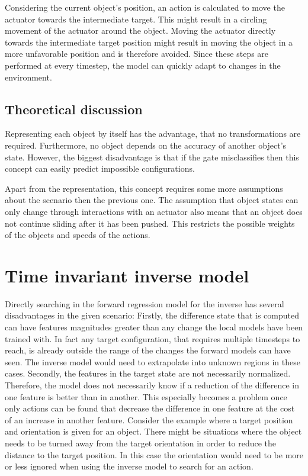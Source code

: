 Considering the current object's position, an action is calculated to move the actuator towards the intermediate target. This might result in a circling movement of the actuator around the object. Moving the actuator directly towards the intermediate target position might result in moving the object in a more unfavorable position and is therefore avoided. Since these steps are performed at every timestep, the model can quickly adapt to changes in the environment.
	
\subsection{Theoretical discussion}

Representing each object by itself has the advantage, that no transformations are required. Furthermore, no object depends on the accuracy of another object's state. However, the biggest disadvantage is that if the gate misclassifies then this concept can easily predict impossible configurations. 

Apart from the representation, this concept requires some more assumptions about the scenario then the previous one. The assumption that object states can only change through interactions with an actuator also means that an object does not continue sliding after it has been pushed. This restricts the possible weights of the objects and speeds of the actions.

\section{Time invariant inverse model \label{sec:invModel}}
	
Directly searching in the forward regression model for the inverse has several disadvantages in the given scenario: Firstly, the difference state that is computed can have features magnitudes greater than any change the local models have been trained with. In fact any target configuration, that requires multiple timesteps to reach, is already outside the range of the changes the forward models can have seen. %
The inverse model would need to extrapolate into unknown regions in these cases. Secondly, the features in the target state are not necessarily normalized. Therefore, the model does not necessarily know if a reduction of the difference in one feature is better than in another. This especially becomes a problem once only actions can be found that decrease the difference in one feature at the cost of an increase in another feature. Consider the example where a target position and orientation is given for an object. There might be situations where the object needs to be turned away from the target orientation in order to reduce the distance to the target position. In this case the orientation would need to be more or less ignored when using the inverse model to search for an action.

